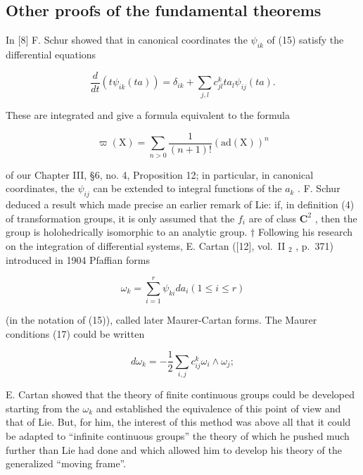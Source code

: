 \subsection*{Other proofs of the fundamental theorems}

In {[}8{]} F. Schur showed that in canonical coordinates the \(\psi_{ik}\) of (15) satisfy the differential equations

\[
\frac {d}{d t} \left(t \psi_ {i k} (t a)\right) = \delta_ {i k} + \sum_ {j, l} c _ {j l} ^ {k} t a _ {l} \psi_ {i j} (t a).\tag{23}
\]

These are integrated and give a formula equivalent to the formula

\[
\varpi (\mathrm{X}) = \sum_ {n > 0} \frac {1}{(n + 1) !} (\mathrm{ad} (\mathrm{X})) ^ {n}\tag{24}
\]

of our Chapter III, §6, no. 4, Proposition 12; in particular, in canonical coordinates, the \(\psi_{ij}\) can be extended to integral functions of the \(a_k\) . F. Schur deduced a result which made precise an earlier remark of Lie: if, in definition (4) of transformation groups, it is only assumed that the \(f_i\) are of class \(\mathbf{C}^2\) , then the group is holohedrically isomorphic to an analytic group. \(\dagger\) Following his research on the integration of differential systems, E. Cartan ({[}12{]}, vol.~II \(_{2}\) , p.~371) introduced in 1904 Pfaffian forms

\[
\omega_ {k} = \sum_ {i = 1} ^ {r} \psi_ {k i} d a _ {i} (1 \leqslant i \leqslant r)\tag{25}
\]

(in the notation of (15)), called later Maurer-Cartan forms. The Maurer conditions (17) could be written

\[
d \omega_ {k} = - \frac {1}{2} \sum_ {i, j} c _ {i j} ^ {k} \omega_ {i} \wedge \omega_ {j};
\]

E. Cartan showed that the theory of finite continuous groups could be developed starting from the \(\omega_{k}\) and established the equivalence of this point of view and that of Lie. But, for him, the interest of this method was above all that it could be adapted to ``infinite continuous groups'' the theory of which he pushed much further than Lie had done and which allowed him to develop his theory of the generalized ``moving frame''.


